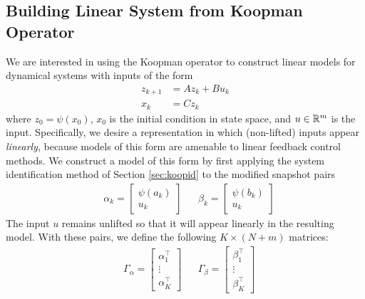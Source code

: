\subsection{Building Linear System from Koopman Operator}

We are interested in using the Koopman operator to construct linear models for dynamical systems with inputs of the form
\begin{equation}
\begin{aligned}
    z_{k+1} &= A z_k + B u_k \\
    x_k &= C z_k
    \label{eq:linSys}
\end{aligned}
\end{equation}
where $z_0 = \psi(x_0)$, $x_0$ is the initial condition in state space, and $u \in \mathbb{R}^m$ is the input.
Specifically, we desire a representation in which (non-lifted) inputs appear \emph{linearly}, because models of this form are amenable to linear feedback control methods.
We construct a model of this form by first applying the system identification method of Section \ref{sec:koopid} to the modified snapshot pairs
\begin{align}
    &\alpha_k = \begin{bmatrix} \psi(a_k) \\ u_k \end{bmatrix} 
    &&\beta_k = \begin{bmatrix} \psi(b_k) \\ u_k \end{bmatrix} 
\end{align}
The input $u$ remains unlifted so that it will appear linearly in the resulting model.
With these pairs, we define the following ${K \times (N + m)}$ matrices:
\begin{align}
    &\Gamma_\alpha = \begin{bmatrix} \alpha_1^\top \\ \vdots \\  \alpha_K^\top \end{bmatrix}
    &&\Gamma_\beta = \begin{bmatrix} \beta_1^\top \\ \vdots \\  \beta_K^\top \end{bmatrix}
    \label{eq:Gamma}
\end{align}
